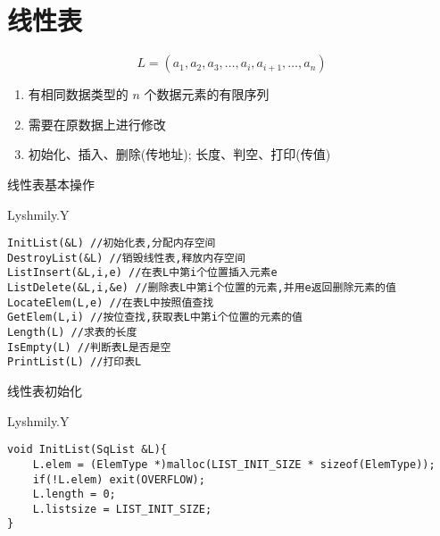 \chapter{线性表}

\begin{definition}[线性表]
    $$L=(a_{1},a_{2},a_{3},\dots,a_{i},a_{i+1},\dots,a_{n})$$
    \begin{enumerate}
        \item 有相同数据类型的 $n$ 个数据元素的有限序列
        \item 需要在原数据上进行修改
        \item 初始化、插入、删除(传地址); 长度、判空、打印(传值)
    \end{enumerate}
\end{definition}
线性表基本操作
\begin{macbox}{Lyshmily.Y}
    \begin{verbatim}
InitList(&L) //初始化表,分配内存空间
DestroyList(&L) //销毁线性表,释放内存空间
ListInsert(&L,i,e) //在表L中第i个位置插入元素e
ListDelete(&L,i,&e) //删除表L中第i个位置的元素,并用e返回删除元素的值
LocateElem(L,e) //在表L中按照值查找
GetElem(L,i) //按位查找,获取表L中第i个位置的元素的值 
Length(L) //求表的长度
IsEmpty(L) //判断表L是否是空
PrintList(L) //打印表L
    \end{verbatim}
\end{macbox}

线性表初始化
\begin{macbox}{Lyshmily.Y}
    \begin{verbatim}
void InitList(SqList &L){
    L.elem = (ElemType *)malloc(LIST_INIT_SIZE * sizeof(ElemType));
    if(!L.elem) exit(OVERFLOW);
    L.length = 0;
    L.listsize = LIST_INIT_SIZE;
}
    \end{verbatim}
\end{macbox}